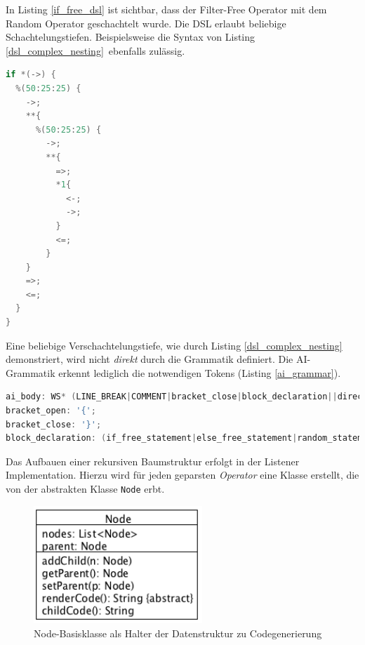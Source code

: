 \documentclass[conference]{IEEEtran}
\begin{document}
In Listing \ref{if_free_dsl} ist sichtbar, dass der Filter-Free Operator mit dem Random Operator geschachtelt wurde. Die DSL erlaubt beliebige Schachtelungstiefen. Beispielsweise die Syntax von Listing \ref{dsl_complex_nesting} ebenfalls zulässig.

\begin{lstlisting}[language=Java, captionpos=b, caption=Komplexere Verschachtelung in AI DSL, label=dsl_complex_nesting]
if *(->) {
  %(50:25:25) {
    ->;
    **{
      %(50:25:25) {
        ->;
        **{
          =>;
          *1{
            <-;
            ->;
          }
          <=;
        }
    }
    =>;
    <=;
  }
}
\end{lstlisting}

Eine beliebige Verschachtelungstiefe, wie durch Listing \ref{dsl_complex_nesting} demonstriert, wird  nicht \emph{direkt} durch die Grammatik definiert. Die AI-Grammatik erkennt lediglich die notwendigen Tokens (Listing \ref{ai_grammar}).

\begin{lstlisting}[language=Java, captionpos=b, caption=Ausschnitt der AI Grammatik, label=ai_grammar]
ai_body: WS* (LINE_BREAK|COMMENT|bracket_close|block_declaration||direction_statement);
bracket_open: '{';
bracket_close: '}';
block_declaration: (if_free_statement|else_free_statement|random_statement|leave_free_statement|get_nth_free_statement);
\end{lstlisting}

Das Aufbauen einer rekursiven Baumstruktur erfolgt in der Listener Implementation. Hierzu wird für jeden geparsten \emph{Operator} eine Klasse erstellt, die von der abstrakten Klasse \texttt{Node} erbt.


\begin{figure}[!htb]
\centering
\includegraphics[width=2.5in]{node_structure_node.png}

\caption{Node-Basisklasse als Halter der Datenstruktur zu Codegenerierung}
\label{node_class}
\end{figure}
\end{document}
